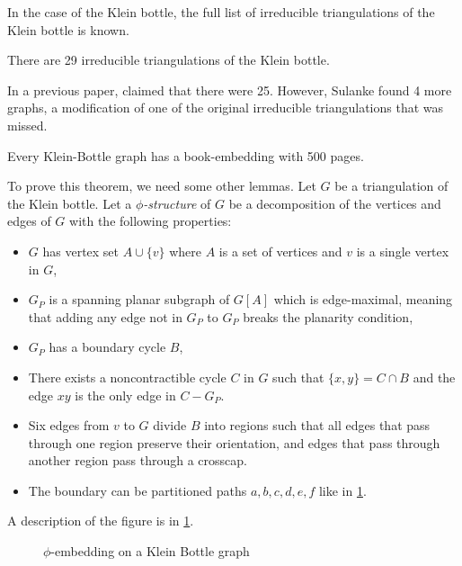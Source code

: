 In the case of the Klein bottle, the full list of irreducible triangulations of the Klein bottle is known. 
\begin{theorem}
    There are 29 irreducible triangulations of the Klein bottle. 
\end{theorem} 
In a previous paper, \textcite{lawrencenkoIrreducibleTriangulationsKlein1997} claimed that there were 25. However, Sulanke found 4 more graphs, a modification of one of the original irreducible triangulations that was missed. 

\begin{theorem}
    Every Klein-Bottle graph has a book-embedding with 500 pages.
\end{theorem}

To prove this theorem, we need some other lemmas. Let $G$ be a triangulation of the Klein bottle. Let a \textit{$\phi$-structure} of $G$ be a decomposition of the vertices and edges of $G$ with the following properties:
\begin{itemize}
    \item $G$ has vertex set $A \cup \{v\}$ where $A$ is a set of vertices and $v$ is a single vertex in $G$,
    \item $G_P$ is a spanning planar subgraph of $G[A]$ which is edge-maximal, meaning that adding any edge not in $G_P$ to $G_P$ breaks the planarity condition,
    \item $G_P$ has a boundary cycle $B$,
    \item There exists a noncontractible cycle $C$ in $G$ such that $\{x, y\} = C \cap B$ and the edge $xy$ is the only edge in $C - G_P$. 
    \item Six edges from $v$ to $G$ divide $B$ into regions such that all edges that pass through one region preserve their orientation, and edges that pass through another region pass through a crosscap. 
    \item The boundary can be partitioned paths $a, b, c, d, e, f$ like in \cref{fig:phiembedding}. 
\end{itemize}

A description of the figure is in \cref{fig:phiembedding}.

\begin{figure}[h]
    \centering
    
    \caption{$\phi$-embedding on a Klein Bottle graph}\label{fig:phiembedding}
\end{figure}


